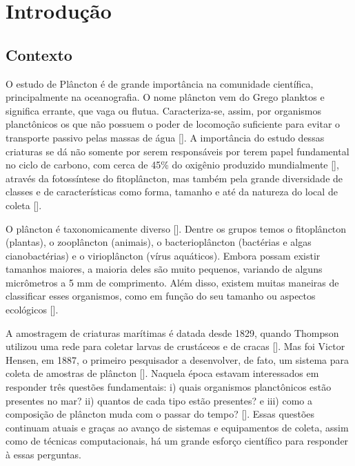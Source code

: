 \chapter{Introdução}
\label{cap:introducao}


\section{Contexto}
\label{sec:intro_contexto}



O estudo de Plâncton é de grande importância na comunidade científica, principalmente na oceanografia. O nome plâncton vem do Grego planktos e significa errante, que vaga ou flutua. Caracteriza-se, assim, por organismos planctônicos os que não possuem o poder de locomoção suficiente para evitar o transporte passivo pelas massas de água [\cite{ciotti2015vida, calazans2011organismos}].  A importância do estudo dessas criaturas se dá não somente por serem responsáveis por terem papel fundamental no ciclo de carbono, com cerca de 45\% do oxigênio produzido mundialmente [\cite{brierleyplankton}],  através da fotossíntese do fitoplâncton, mas também pela grande diversidade de classes e de características como forma, tamanho e até da natureza do local de coleta [\cite{calazans2011organismos}]. 

O plâncton é taxonomicamente diverso [\cite{brierleyplankton}]. Dentre os grupos temos o fitoplâncton (plantas), o zooplâncton (animais), o bacterioplâncton (bactérias e algas cianobactérias) e o virioplâncton (vírus aquáticos). Embora possam existir tamanhos maiores, a maioria deles são muito pequenos, variando de alguns micrômetros a 5 mm de comprimento. Além disso, existem muitas maneiras de classificar esses organismos, como em função do seu tamanho ou aspectos ecológicos [\cite{calazans2011organismos}].


A amostragem de criaturas marítimas é datada desde 1829, quando Thompson utilizou uma rede para coletar larvas de crustáceos e de cracas [\cite{brierleyplankton}]. Mas foi Victor Hensen, em 1887, o primeiro pesquisador a desenvolver, de fato, um sistema para coleta de amostras de plâncton [\cite{benfield2007rapid, wiebe2003hensen, allen1919contribution}]. Naquela época estavam interessados em responder três questões fundamentais: i) quais organismos planctônicos estão presentes no mar? ii) quantos de cada tipo estão presentes? e iii) como a composição de plâncton muda com o passar do tempo?  [\cite{benfield2007rapid}]. Essas questões continuam atuais e graças ao avanço de sistemas e equipamentos de coleta, assim como de técnicas computacionais, há um grande esforço científico para responder à essas perguntas.


